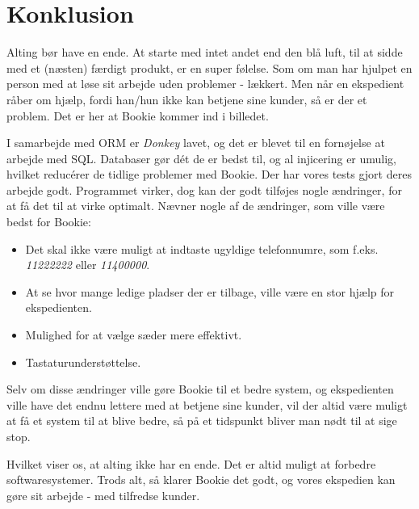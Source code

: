 \chapter{Konklusion}

Alting bør have en ende. At starte med intet andet end den blå luft, til at sidde med et (næsten) færdigt produkt, er en super følelse. Som om man har hjulpet en person med at løse sit arbejde uden problemer - lækkert. Men når en ekspedient råber om hjælp, fordi han/hun ikke kan betjene sine kunder, så er der et problem. Det er her at Bookie kommer ind i billedet.

I samarbejde med ORM er \textit{Donkey} lavet, og det er blevet til en fornøjelse at arbejde med SQL. Databaser gør dét de er bedst til, og al injicering er umulig, hvilket reducérer de tidlige problemer med Bookie. Der har vores tests gjort deres arbejde godt.
Programmet virker, dog kan der godt tilføjes nogle ændringer, for at få det til at virke optimalt. Nævner nogle af de ændringer, som ville være bedst for Bookie:

\begin{itemize}
  \item Det skal ikke være muligt at indtaste ugyldige telefonnumre, som f.eks. \textit{
  11222222} eller \textit{11400000}.
  \item At se hvor mange ledige pladser der er tilbage, ville være en stor hjælp for ekspedienten.
  \item Mulighed for at vælge sæder mere effektivt.
  
  \item Tastaturunderstøttelse.
  
\end{itemize}
Selv om disse ændringer ville gøre Bookie til et bedre system, og ekspedienten ville have det endnu lettere med at betjene sine kunder, vil der altid være muligt at få et system til at blive bedre, så på et tidspunkt bliver man nødt til at sige stop.

Hvilket viser os, at alting ikke har en ende. Det er altid muligt at forbedre softwaresystemer. Trods alt, så klarer Bookie det godt, og vores ekspedien kan gøre sit arbejde - med tilfredse kunder.